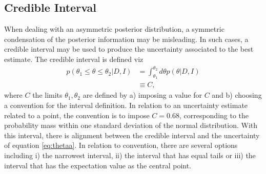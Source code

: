 \subsection{Credible Interval}
When dealing with an asymmetric posterior distribution, a symmetric condensation of the posterior information may be misleading. In such cases, a credible interval may be used to produce the uncertainty associated to the best estimate. The credible interval is defined viz
\begin{equation}
	\begin{split}
		p(\theta_1\leq \theta \leq \theta_2|D,I) &= \int_{\theta_1}^{\theta_2}d\theta p(\theta|D,I) \\
												& \equiv C,
	\end{split}
\end{equation}
where $C$ the limits $\theta_1,\theta_2$ are defined by a) imposing a value for $C$ and b) choosing a convention for the interval definition. In relation to an uncertainty estimate related to a point, the convention is to impose $C=0.68$, corresponding to the probability mass within one standard deviation of the normal distribution. With this interval, there is alignment between the credible interval and the uncertainty of equation \eqref{eq:thetaa}. In relation to convention, there are several options including i) the narrowest interval, ii) the interval that has equal tails or iii) the interval that has the expectation value as the central point. 


